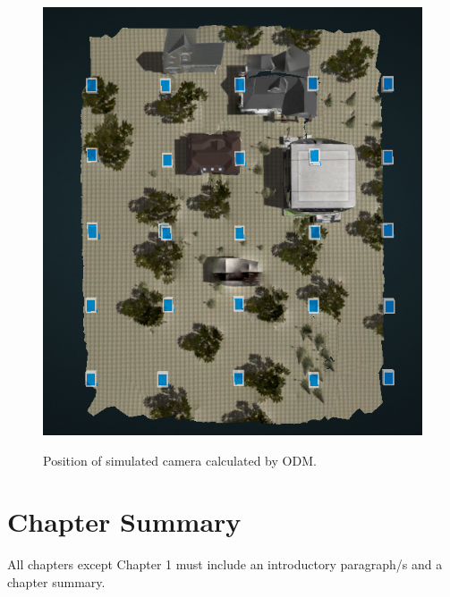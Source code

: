 \begin{figure}
	\centering
	\caption[Position of simulated camera calculated by ODM.]{\small Position of simulated camera calculated by ODM.} 
	\includegraphics[width=5in]{figures/experiment/simulated-camera}
	\label{fig:simulated-camera-position}
\end{figure}

\section{Chapter Summary}
All chapters except Chapter 1 must include an introductory paragraph/s and a chapter summary.


\FloatBarrier